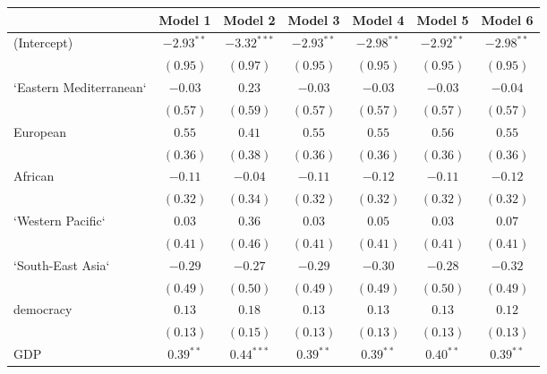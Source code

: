 
\begin{table}[!h]
\begin{center}
\begin{tabular}{l c c c c c c }
\toprule
 & Model 1 & Model 2 & Model 3 & Model 4 & Model 5 & Model 6 \\
\midrule
(Intercept)             & $-2.93^{**}$ & $-3.32^{***}$ & $-2.93^{**}$ & $-2.98^{**}$ & $-2.92^{**}$ & $-2.98^{**}$ \\
                        & $(0.95)$     & $(0.97)$      & $(0.95)$     & $(0.95)$     & $(0.95)$     & $(0.95)$     \\
`Eastern Mediterranean` & $-0.03$      & $0.23$        & $-0.03$      & $-0.03$      & $-0.03$      & $-0.04$      \\
                        & $(0.57)$     & $(0.59)$      & $(0.57)$     & $(0.57)$     & $(0.57)$     & $(0.57)$     \\
European                & $0.55$       & $0.41$        & $0.55$       & $0.55$       & $0.56$       & $0.55$       \\
                        & $(0.36)$     & $(0.38)$      & $(0.36)$     & $(0.36)$     & $(0.36)$     & $(0.36)$     \\
African                 & $-0.11$      & $-0.04$       & $-0.11$      & $-0.12$      & $-0.11$      & $-0.12$      \\
                        & $(0.32)$     & $(0.34)$      & $(0.32)$     & $(0.32)$     & $(0.32)$     & $(0.32)$     \\
`Western Pacific`       & $0.03$       & $0.36$        & $0.03$       & $0.05$       & $0.03$       & $0.07$       \\
                        & $(0.41)$     & $(0.46)$      & $(0.41)$     & $(0.41)$     & $(0.41)$     & $(0.41)$     \\
`South-East Asia`       & $-0.29$      & $-0.27$       & $-0.29$      & $-0.30$      & $-0.28$      & $-0.32$      \\
                        & $(0.49)$     & $(0.50)$      & $(0.49)$     & $(0.49)$     & $(0.50)$     & $(0.49)$     \\
democracy               & $0.13$       & $0.18$        & $0.13$       & $0.13$       & $0.13$       & $0.12$       \\
                        & $(0.13)$     & $(0.15)$      & $(0.13)$     & $(0.13)$     & $(0.13)$     & $(0.13)$     \\
GDP                     & $0.39^{**}$  & $0.44^{***}$  & $0.39^{**}$  & $0.39^{**}$  & $0.40^{**}$  & $0.39^{**}$  \\

\end{tabular}
\end{center}
\end{table}

